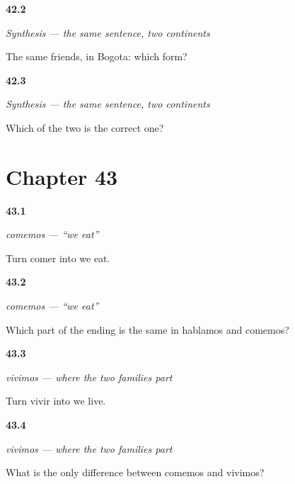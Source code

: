 \noindent\begin{minipage}[t]{\linewidth}
\raggedright
\hypertarget{review-ES-C07-sintesis-dos-continentes-bogota}{\textbf{42.2}} \emph{Synthesis — the same sentence, two continents}\par
\small The same friends, in Bogota: which form?
\end{minipage}\par\medskip

\noindent\begin{minipage}[t]{\linewidth}
\raggedright
\hypertarget{review-ES-C07-sintesis-dos-continentes-which}{\textbf{42.3}} \emph{Synthesis — the same sentence, two continents}\par
\small Which of the two is the correct one?
\end{minipage}\par\medskip

\section*{Chapter 43}

\noindent\begin{minipage}[t]{\linewidth}
\raggedright
\hypertarget{review-ES-C07-comemos-form}{\textbf{43.1}} \emph{comemos — \textquotedblleft{}we eat\textquotedblright{}}\par
\small Turn comer into we eat.
\end{minipage}\par\medskip

\noindent\begin{minipage}[t]{\linewidth}
\raggedright
\hypertarget{review-ES-C07-comemos-part}{\textbf{43.2}} \emph{comemos — \textquotedblleft{}we eat\textquotedblright{}}\par
\small Which part of the ending is the same in hablamos and comemos?
\end{minipage}\par\medskip

\noindent\begin{minipage}[t]{\linewidth}
\raggedright
\hypertarget{review-ES-C07-vivimos-form}{\textbf{43.3}} \emph{vivimos — where the two families part}\par
\small Turn vivir into we live.
\end{minipage}\par\medskip

\noindent\begin{minipage}[t]{\linewidth}
\raggedright
\hypertarget{review-ES-C07-vivimos-contrast}{\textbf{43.4}} \emph{vivimos — where the two families part}\par
\small What is the only difference between comemos and vivimos?
\end{minipage}\par\medskip

